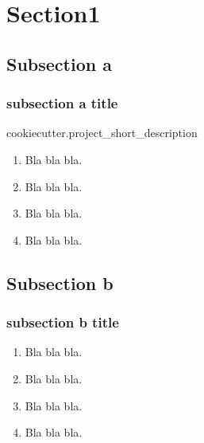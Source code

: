 \section{Section1}
%
\subsection{Subsection a}
\begin{frame}[label=sectiona]
\frametitle{subsection a title} 

{{cookiecutter.project_short_description}}

\begin{enumerate}
\item Bla bla bla.\\
\item Bla bla bla.\\
\item Bla bla bla.\\
\item Bla bla bla.\\
\end{enumerate}
\end{frame}


%
\subsection{Subsection b}
\begin{frame}[label=sectionb]
\frametitle{subsection b title} 
\begin{enumerate}
\item Bla bla bla.\\
\item Bla bla bla.\\
\item Bla bla bla.\\
\item Bla bla bla.\\
\end{enumerate}
\end{frame}
